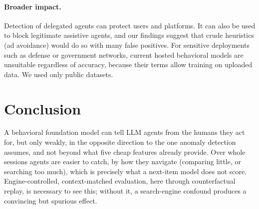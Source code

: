 \paragraph{Broader impact.} Detection of delegated agents can protect users and platforms. It can also be used to block legitimate assistive agents, and our findings suggest that crude heuristics (ad avoidance) would do so with many false positives. For sensitive deployments such as defense or government networks, current hosted behavioral models are unsuitable regardless of accuracy, because their terms allow training on uploaded data. We used only public datasets.

\section{Conclusion}
A behavioral foundation model can tell LLM agents from the humans they act for, but only weakly, in the opposite direction to the one anomaly detection assumes, and not beyond what five cheap features already provide. Over whole sessions agents are easier to catch, by how they navigate (comparing little, or searching too much), which is precisely what a next-item model does not score. Engine-controlled, context-matched evaluation, here through counterfactual replay, is necessary to see this; without it, a search-engine confound produces a convincing but spurious effect.
